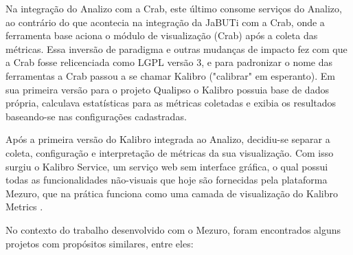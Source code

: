 Na integração do Analizo com a Crab, este último consome serviços do Analizo, ao contrário do que acontecia na integração da JaBUTi com a Crab, onde a ferramenta base aciona o módulo de visualização (Crab) após a coleta das métricas. Essa inversão de paradigma e outras mudanças de impacto fez com que a Crab fosse relicenciada como LGPL versão 3, e para padronizar o nome das ferramentas a Crab passou a se chamar Kalibro ("calibrar" em esperanto). Em sua primeira versão para o projeto Qualipso o Kalibro possuia base de dados própria, calculava estatísticas para as métricas coletadas e exibia os resultados baseando-se nas configurações cadastradas. 

Após a primeira versão do Kalibro integrada ao Analizo, decidiu-se separar a coleta, configuração e interpretação de métricas da sua visualização. Com isso surgiu o Kalibro Service, um serviço web sem interface gráfica, o qual possui todas as funcionalidades não-visuais que hoje são fornecidas pela plataforma Mezuro, que na prática funciona como uma camada de visualização do Kalibro Metrics \cite{meirelles2013metrics}.

No contexto do trabalho desenvolvido com o Mezuro, foram encontrados alguns projetos com propósitos similares\cite{meirelles2010mezuro}, entre eles:

